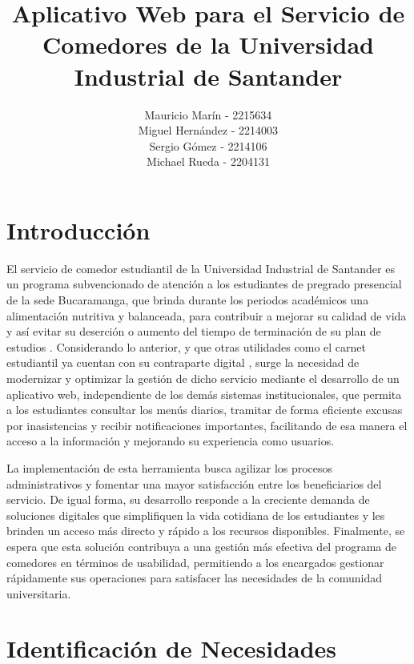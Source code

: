 \documentclass[stu, 12pt, letterpaper, donotrepeattitle, floatsintext, natbib]{apa7}
\title{\Large Aplicativo Web para el Servicio de Comedores de la Universidad Industrial de Santander}
\author{Mauricio Marín - 2215634 \\Miguel Hernández - 2214003 \\Sergio Gómez - 2214106 \\Michael Rueda - 2204131}
\affiliation{Universidad Industrial de Santander}
\begin{document}
\maketitle


\renewcommand\contentsname{\largeÍndice}
\tableofcontents
\setcounter{tocdepth}{2}
\newpage




\section{Introducción}
El servicio de comedor estudiantil de la Universidad Industrial de Santander es un programa subvencionado de atención a los estudiantes de pregrado presencial de la sede Bucaramanga, que brinda durante los periodos académicos una alimentación nutritiva y balanceada, para contribuir a mejorar su calidad de vida y así evitar su deserción o aumento del tiempo de terminación de su plan de estudios \citep{UIS2024}. Considerando lo anterior, y que otras utilidades como el carnet estudiantil ya cuentan con su contraparte digital \citep{UIS_Carnet_Digital}, surge la necesidad de modernizar y optimizar la gestión de dicho servicio mediante el desarrollo de un aplicativo web, independiente de los demás sistemas institucionales, que permita a los estudiantes consultar los menús diarios, tramitar de forma eficiente excusas por inasistencias y recibir notificaciones importantes, facilitando de esa manera el acceso a la información y mejorando su experiencia como usuarios.

La implementación de esta herramienta busca agilizar los procesos administrativos y fomentar una mayor satisfacción entre los beneficiarios del servicio. De igual forma, su desarrollo responde a la creciente demanda de soluciones digitales que simplifiquen la vida cotidiana de los estudiantes y les brinden un acceso más directo y rápido a los recursos disponibles. Finalmente, se espera que esta solución contribuya a una gestión más efectiva del programa de comedores en términos de usabilidad, permitiendo a los encargados gestionar rápidamente sus operaciones para satisfacer las necesidades de la comunidad universitaria.


\newpage
\section{Identificación de Necesidades} 
\end{document}
